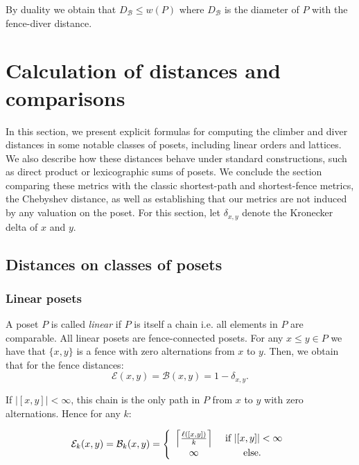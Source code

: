 \documentclass{article}[12pt]
\theoremstyle{exampstyle}
\newtheorem{corollary}[theorem]{Corollary}
\theoremstyle{remark}
\newcommand{\B}{\mathcal{B}}
\newcommand{\E}{\mathcal{E}}
\DeclarePairedDelimiter{\ceil}{\lceil}{\rceil}
\newcommand{\myceil}[2][k]{\ceil[\Big]{\frac{#2 }{#1}}}
\begin{document}
By duality we obtain that  \hbox{$D_{\B} \leq w(P)$} where $D_{\B}$ is the diameter of $P$ with the fence-diver distance.



\section{Calculation of distances and comparisons}
\label{Sec:notable_posets}


In this section, we present explicit formulas for computing the climber and diver distances in some notable classes of posets, including linear orders and lattices. We also describe how these distances behave under standard constructions, such as direct product or lexicographic sums of posets.  We conclude the section comparing these metrics with the classic shortest-path and shortest-fence metrics, the Chebyshev distance, as well as establishing that our metrics are not induced by any valuation on the poset. For this section, let $\delta_{x,y}$ denote the Kronecker delta of $x$ and $y$.

\subsection{Distances on classes of posets}

\subsubsection*{Linear posets}

A poset $P$ is called \textit{linear} if $P$ is itself a chain i.e. all elements in $P$ are comparable. All linear posets are fence-connected posets. For any $x \leq y \in P$ we have that $\{x,y\}$ is a fence with zero alternations from $x$ to $y$. Then, we obtain that for the fence distances: 
\begin{equation*}
    \E(x,y) = \B(x,y) = 1 - \delta_{x,y}.
\end{equation*}

If $|[x,y]| < \infty$, this chain is the only path in $P$ from $x$ to $y$ with zero alternations. Hence for any $k$:

\begin{equation*}
    \E_k(x,y) = \B_k(x,y) = \left\{ 
    \begin{array}{cc}
        \myceil{\ell([x,y])} & \text{ if }|[x,y]| < \infty\\
         \infty & \text{else}.
    \end{array}
    \right. 
\end{equation*}
\end{document}
